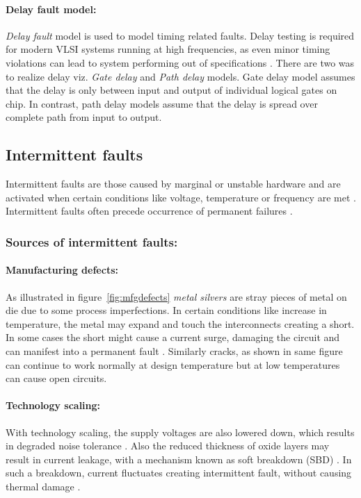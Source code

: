 \paragraph{Delay fault model:}
\emph{Delay fault} model is used to model timing related faults. Delay testing is required for modern VLSI systems running at high frequencies, as even minor timing violations can lead to system performing out of specifications \cite{Larsson2006}. There are two was to realize delay viz. \emph{Gate delay} and \emph{Path delay} models. Gate delay model assumes that the delay is only between input and output of individual logical gates on chip. In contrast, path delay models assume that the delay is spread over complete path from input to output. 

\subsection{Intermittent faults}
\label{sec:secif}
Intermittent faults are those caused by marginal or unstable hardware and are activated when certain conditions like voltage, temperature or frequency are met \cite{Constantinescu2003, Lehtonen2009}. Intermittent faults often precede occurrence of permanent failures \cite{Lehtonen2009}.

\subsubsection{Sources of intermittent faults:}
\paragraph{Manufacturing defects:}As illustrated in figure~\ref{fig:mfgdefects} \emph{metal silvers} are stray pieces of metal on die due to some process imperfections. In certain conditions like increase in temperature, the metal may expand and touch the interconnects creating a short. In some cases the short might cause a current surge, damaging the circuit and can manifest into a permanent fault \cite{Hawkins2003}. Similarly cracks, as shown in same figure can continue to work normally at design temperature but at low temperatures can cause open circuits.

\paragraph{Technology scaling:} With technology scaling, the supply voltages are also lowered down, which results in degraded noise tolerance \cite{Lehtonen2009}. Also the reduced thickness of oxide layers may result in current leakage, with a mechanism known as soft breakdown (SBD) \cite{Stathis2001}. In such a breakdown, current fluctuates creating intermittent fault, without causing thermal damage \cite{Stathis2001, Constantinescu2007a, Constantinescu2007}.

